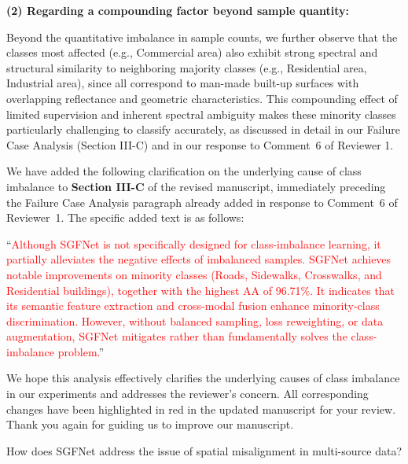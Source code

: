 \textbf{(2) Regarding a compounding factor beyond sample quantity:}

Beyond the quantitative imbalance in sample counts, we further observe that the classes most affected (e.g., Commercial area) also exhibit strong spectral and structural similarity to neighboring majority classes (e.g., Residential area, Industrial area), since all correspond to man-made built-up surfaces with overlapping reflectance and geometric characteristics. This compounding effect of limited supervision and inherent spectral ambiguity makes these minority classes particularly challenging to classify accurately, as discussed in detail in our Failure Case Analysis (Section III-C) and in our response to Comment~6 of Reviewer 1.

We have added the following clarification on the underlying cause of class imbalance to \textbf{Section III-C} of the revised manuscript, immediately preceding the Failure Case Analysis paragraph already added in response to Comment~6 of Reviewer~1. The specific added text is as follows:

``\textcolor{red}{Although SGFNet is not specifically designed for class-imbalance learning, it partially alleviates the negative effects of imbalanced samples. SGFNet achieves notable improvements on minority classes (Roads, Sidewalks, Crosswalks, and Residential buildings), together with the highest AA of 96.71\%. It indicates that its semantic feature extraction and cross-modal fusion enhance minority-class discrimination. However, without balanced sampling, loss reweighting, or data augmentation, SGFNet mitigates rather than fundamentally solves the class-imbalance problem.}''

We hope this analysis effectively clarifies the underlying causes of class imbalance in our experiments and addresses the reviewer's concern. All corresponding changes have been highlighted in red in the updated manuscript for your review. Thank you again for guiding us to improve our manuscript.

\vspace{2em}

\begin{tcolorbox}[title={Reviewer \#2, Comment \#2}]
  \vspace{1em}
  
  \color{blue}
  How does SGFNet address the issue of spatial misalignment in multi-source data?

  \vspace{1em}
\end{tcolorbox}

